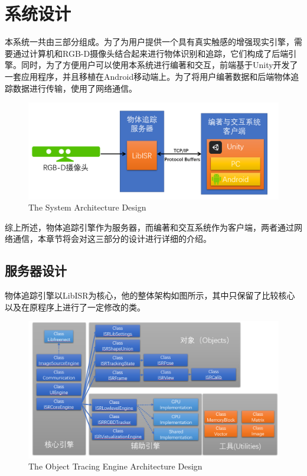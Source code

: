 \chapter{系统设计}
\label{design}

本系统一共由三部分组成。为了为用户提供一个具有真实触感的增强现实引擎，需要通过计算机和RGB-D摄像头结合起来进行物体识别和追踪，它们构成了后端引擎。同时，为了方便用户可以使用本系统进行编著和交互，前端基于Unity开发了一套应用程序，并且移植在Android移动端上。为了将用户编著数据和后端物体追踪数据进行传输，使用了网络通信。

\begin{figure}[!htp]
  \centering
  \includegraphics[width=12cm]{figure/TotalArc.png}
    {The System Architecture Design}
 \label{fig:totalarc}
\end{figure}

综上所述，物体追踪引擎作为服务器，而编著和交互系统作为客户端，两者通过网络通信，本章节将会对这三部分的设计进行详细的介绍。

\section{服务器设计}

物体追踪引擎以LibISR为核心\cite{Ren_3DV_2014, star3d_iccv_2013}，他的整体架构如图所示，其中只保留了比较核心以及在原程序上进行了一定修改的类。

\begin{figure}[!htp]
  \centering
  \includegraphics[width=12cm]{figure/LibArc.png}
    {The Object Tracing Engine Architecture Design}
 \label{fig:labarc}
\end{figure}

